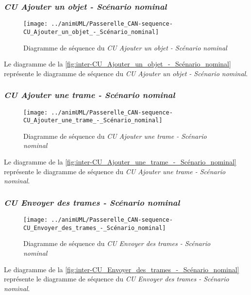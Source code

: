 \subsubsection{\emph{CU Ajouter un objet - Scénario nominal}}
\begin{figure}[H]
	\centering
	\texttt{[image: ../animUML/Passerelle\_CAN-sequence-CU\_Ajouter\_un\_objet\_-\_Scénario\_nominal]}
	\caption{Diagramme de séquence du \emph{CU Ajouter un objet - Scénario nominal}}
	\label{fig:inter-CU_Ajouter_un_objet_-_Scénario_nominal}
\end{figure}
Le diagramme de la \autoref{fig:inter-CU_Ajouter_un_objet_-_Scénario_nominal} représente le diagramme de séquence du \emph{CU Ajouter un objet - Scénario nominal}.


\subsubsection{\emph{CU Ajouter une trame - Scénario nominal}}
\begin{figure}[H]
	\centering
	\texttt{[image: ../animUML/Passerelle\_CAN-sequence-CU\_Ajouter\_une\_trame\_-\_Scénario\_nominal]}
	\caption{Diagramme de séquence du \emph{CU Ajouter une trame - Scénario nominal}}
	\label{fig:inter-CU_Ajouter_une_trame_-_Scénario_nominal}
\end{figure}
Le diagramme de la \autoref{fig:inter-CU_Ajouter_une_trame_-_Scénario_nominal} représente le diagramme de séquence du \emph{CU Ajouter une trame - Scénario nominal}.


\subsubsection{\emph{CU Envoyer des trames - Scénario nominal}}
\begin{figure}[H]
	\centering
	\texttt{[image: ../animUML/Passerelle\_CAN-sequence-CU\_Envoyer\_des\_trames\_-\_Scénario\_nominal]}
	\caption{Diagramme de séquence du \emph{CU Envoyer des trames - Scénario nominal}}
	\label{fig:inter-CU_Envoyer_des_trames_-_Scénario_nominal}
\end{figure}
Le diagramme de la \autoref{fig:inter-CU_Envoyer_des_trames_-_Scénario_nominal} représente le diagramme de séquence du \emph{CU Envoyer des trames - Scénario nominal}.


